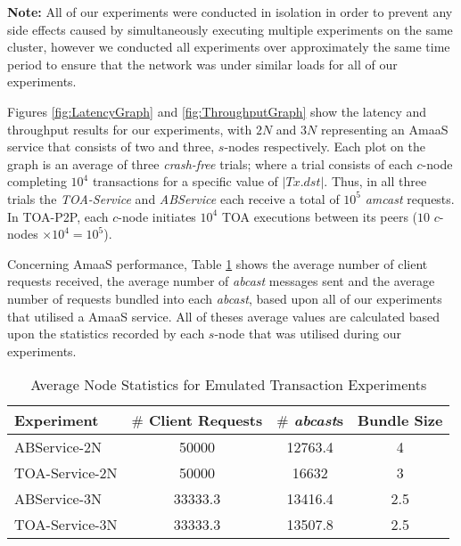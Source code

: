 	\textbf{Note:} All of our experiments were conducted in isolation in order to prevent any side effects caused by simultaneously executing multiple experiments on the same cluster, however we conducted all experiments over approximately the same time period to ensure that the network was under similar loads for all of our experiments. 
	
	Figures \ref{fig:LatencyGraph} and \ref{fig:ThroughputGraph} show the latency and throughput results for our experiments, with $2N$ and $3N$ representing an \textsf{AmaaS} service that consists of two and three, $s$-nodes respectively.  Each plot on the graph is an average of three \emph{crash-free} trials; where a trial consists of each $c$-node completing $10^4$ transactions for a specific value of $|Tx.dst|$. Thus, in all three trials the \emph{TOA-Service} and \emph{ABService} each receive a total of $10^5$ \emph{amcast} requests. In TOA-P2P, each $c$-node initiates $10^4$ TOA executions between its peers ($10$ $c$-nodes $\times 10^4 = 10^5$).  
	
	Concerning \textsf{AmaaS} performance, Table \ref{table:emulated_transaction_averages} shows the average number of client requests received, the average number of \emph{abcast} messages sent and the average number of requests bundled into each \emph{abcast}, based upon all of our experiments that utilised a \textsf{AmaaS} service.  All of theses average values are calculated based upon the statistics recorded by each $s$-node that was utilised during our experiments. 
	
    \begin{table}[h]
  \begin{center}
    \begin{tabular}{|l|c|c|c|}
    \hline
    Experiment & $\#$ Client Requests  & $\#$ \emph{abcast}s & Bundle Size \\ \hline \hline
    ABService-2N     & 50000    &    12763.4    &    4 \\ \hline
    TOA-Service-2N  & 50000    &   16632    &   3 \\ \hline
    ABService-3N     & 33333.3 &    13416.4  &   2.5 \\ \hline
    TOA-Service-3N  & 33333.3 &    13507.8 & 2.5 \\ \hline
    \end{tabular}
    \caption{Average Node Statistics for Emulated Transaction Experiments}
    \label{table:emulated_transaction_averages}
  \end{center}
\end{table}	
	
